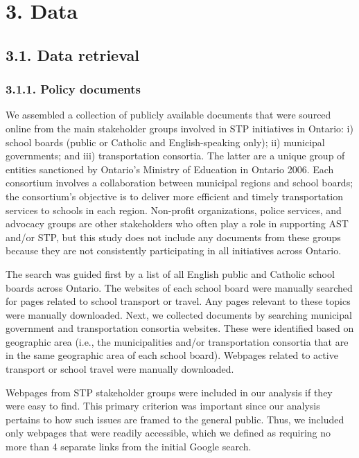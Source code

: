 \documentclass[]{elsarticle} %
\begin{document}
\hypertarget{data}{%
\section{3. Data}\label{data}}

\hypertarget{data-retrieval}{%
\subsection{3.1. Data retrieval}\label{data-retrieval}}

\hypertarget{policy-documents}{%
\subsubsection{3.1.1. Policy documents}\label{policy-documents}}

We assembled a collection of publicly available documents that were
sourced online from the main stakeholder groups involved in STP
initiatives in Ontario: i) school boards (public or Catholic and
English-speaking only); ii) municipal governments; and iii)
transportation consortia. The latter are a unique group of entities
sanctioned by Ontario's Ministry of Education in Ontario 2006. Each
consortium involves a collaboration between municipal regions and school
boards; the consortium's objective is to deliver more efficient and
timely transportation services to schools in each region. Non-profit
organizations, police services, and advocacy groups are other
stakeholders who often play a role in supporting AST and/or STP, but
this study does not include any documents from these groups because they
are not consistently participating in all initiatives across Ontario.

The search was guided first by a list of all English public and Catholic
school boards across Ontario. The websites of each school board were
manually searched for pages related to school transport or travel. Any
pages relevant to these topics were manually downloaded. Next, we
collected documents by searching municipal government and transportation
consortia websites. These were identified based on geographic area
(i.e., the municipalities and/or transportation consortia that are in
the same geographic area of each school board). Webpages related to
active transport or school travel were manually downloaded.

Webpages from STP stakeholder groups were included in our analysis if
they were easy to find. This primary criterion was important since our
analysis pertains to how such issues are framed to the general public.
Thus, we included only webpages that were readily accessible, which we
defined as requiring no more than 4 separate links from the initial
Google search.
\end{document}
